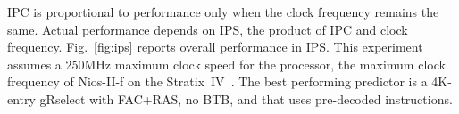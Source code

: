 
IPC is proportional to performance only when the clock frequency remains the same. Actual performance depends  on IPS, the product of IPC and clock frequency. Fig.~\ref{fig:ips} reports overall performance in IPS. This experiment assumes a 250MHz maximum clock speed for the processor, the maximum clock frequency of Nios-II-f on the Stratix~IV~\cite{niosfmax}. The best performing predictor is a 4K-entry gRselect with FAC+RAS, no BTB, and that uses pre-decoded instructions.


